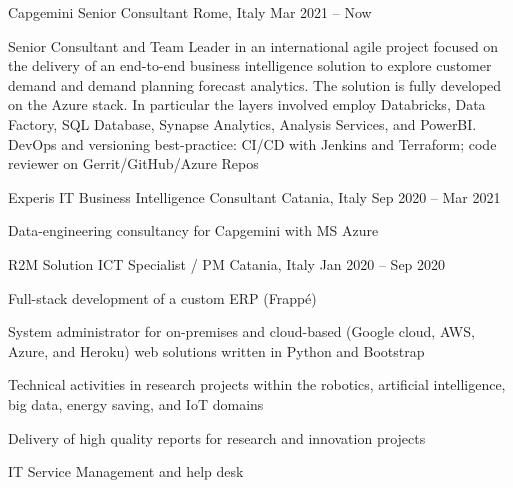 
  \begin{cventries}
    \cventry
    {Capgemini}    
    {Senior Consultant}
    {Rome, Italy}
    {Mar 2021 -- Now}
    {
      \begin{cvitems}
        \item {Senior Consultant and Team Leader in an international agile project focused on the delivery of an end-to-end business intelligence solution to explore customer demand and demand planning forecast analytics. The solution is fully developed on the Azure stack. In particular the layers involved employ Databricks, Data Factory, SQL Database, Synapse Analytics, Analysis Services, and PowerBI. DevOps and versioning best-practice: CI/CD with Jenkins and Terraform; code reviewer on Gerrit/GitHub/Azure Repos}
      \end{cvitems}
    }

    \cventry
    {Experis IT}    
    {Business Intelligence Consultant}
    {Catania, Italy}
    {Sep 2020 -- Mar 2021}
    {
      \begin{cvitems}
        \item {Data-engineering consultancy for Capgemini with MS Azure}
      \end{cvitems}
    }

    \cventry
    {R2M Solution}    
    {ICT Specialist / PM}
    {Catania, Italy}
    {Jan 2020 -- Sep 2020}
    {
      \begin{cvitems}
        \item {Full-stack development of a custom ERP (Frappé)}
        \item {System administrator for on-premises and cloud-based (Google cloud, AWS, Azure, and Heroku) web solutions written in Python and Bootstrap}
        \item {Technical activities in research projects within the robotics, artificial intelligence, big data, energy saving, and IoT domains}
        \item {Delivery of high quality reports for research and innovation projects}
        \item {IT Service Management and help desk}
      \end{cvitems}
    }



\end{cventries}
